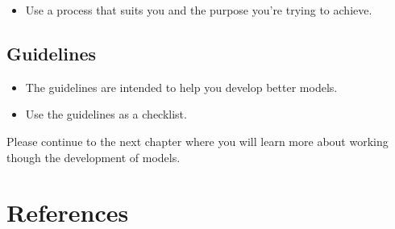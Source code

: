 \documentclass[]{memoir}
\begin{document}
\begin{itemize}
\itemsep1pt\parskip0pt
\item
  Use a process that suits you and the purpose you're trying to achieve.
\end{itemize}

\subsection{Guidelines}

\begin{itemize}
\itemsep1pt\parskip0pt
\item
  The guidelines are intended to help you develop better models.
\item
  Use the guidelines as a checklist.
\end{itemize}

Please continue to the next chapter where you will learn more about
working though the development of models.

\section{References}
\end{document}
